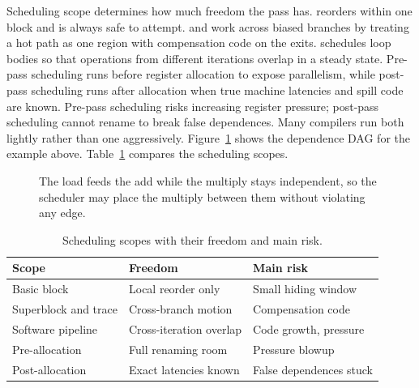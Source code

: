 Scheduling scope determines how much freedom the pass has.
 reorders within one block and is always safe to attempt.
 and  work across biased branches by treating a hot path as one region with compensation code on the exits.
 schedules loop bodies so that operations from different iterations overlap in a steady state.
Pre-pass scheduling runs before register allocation to expose parallelism, while post-pass scheduling runs after allocation when true machine latencies and spill code are known.
Pre-pass scheduling risks increasing register pressure; post-pass scheduling cannot rename to break false dependences.
Many compilers run both lightly rather than one aggressively.
Figure~\ref{fig:ch26-dag} shows the dependence DAG for the example above.
Table~\ref{tab:ch26-scheduler-scope} compares the scheduling scopes.

\begin{figure}[htbp]
\centering
{}
\caption{The load feeds the add while the multiply stays independent, so the scheduler may place the multiply between them without violating any edge.}
\label{fig:ch26-dag}
\end{figure}

\begin{table}[htbp]
\caption{Scheduling scopes with their freedom and main risk.}
\label{tab:ch26-scheduler-scope}
\begin{tabular}{lll}
\toprule
Scope & Freedom & Main risk \\
\midrule
Basic block & Local reorder only & Small hiding window \\
Superblock and trace & Cross-branch motion & Compensation code \\
Software pipeline & Cross-iteration overlap & Code growth, pressure \\
Pre-allocation & Full renaming room & Pressure blowup \\
Post-allocation & Exact latencies known & False dependences stuck \\
\bottomrule
\end{tabular}
\end{table}

